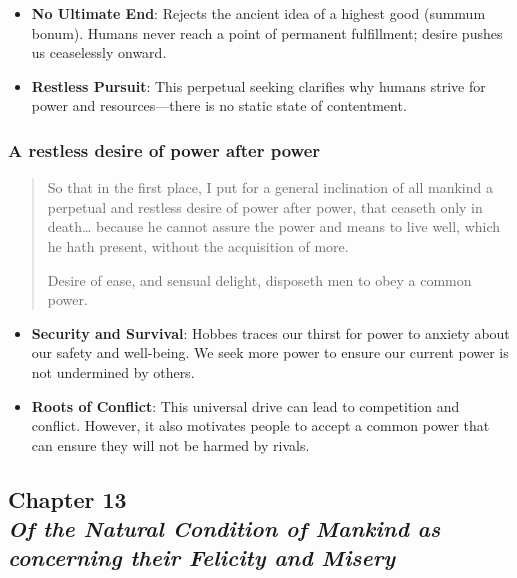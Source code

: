             \begin{itemize}
                \item \textbf{No Ultimate End}: Rejects the ancient idea of a highest good (summum bonum). Humans never reach a point of permanent fulfillment; desire pushes us ceaselessly onward.
                \item \textbf{Restless Pursuit}: This perpetual seeking clarifies why humans strive for power and resources—there is no static state of contentment.
            \end{itemize}

        \subsubsection{A restless desire of power after power}

            \begin{quote}
                So that in the first place, I put for a general inclination of all mankind a perpetual and restless desire of power after power, that ceaseth only in death… because he cannot assure the power and means to live well, which he hath present, without the acquisition of more.
                
                Desire of ease, and sensual delight, disposeth men to obey a common power.
            \end{quote}

            \begin{itemize}
                \item \textbf{Security and Survival}: Hobbes traces our thirst for power to anxiety about our safety and well-being. We seek more power to ensure our current power is not undermined by others.
                \item \textbf{Roots of Conflict}: This universal drive can lead to competition and conflict. However, it also motivates people to accept a common power that can ensure they will not be harmed by rivals.
            \end{itemize}

    \subsection[Of the Natural Condition of Mankind as concerning their Felicity and Misery]{Chapter 13 \\ \textit{Of the Natural Condition of Mankind as concerning their Felicity and Misery}}

